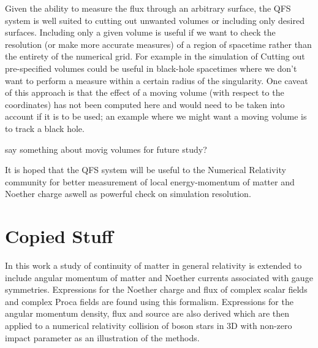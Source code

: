 Given the ability to measure the flux through an arbitrary surface, the QFS system is
well suited to cutting out unwanted volumes or including only desired surfaces. Including
only a given volume is useful if we want to check the resolution (or make more
accurate measures) of a region of spacetime rather than the entirety of the numerical grid. For example
in the simulation of
Cutting out pre-specified volumes could be useful in black-hole spacetimes where we
don't want to perform a measure within a certain radius of the singularity. One caveat of
this approach is that the effect of a moving volume (with respect to the coordinates)
has not been computed here and would need to be taken into account if it is to be used;
an example where we might want a moving volume is to track a black hole.

say something about movig volumes for future study?



It is hoped that the QFS system will be useful to the Numerical Relativity community
for better measurement of local energy-momentum of matter and Noether charge aswell
as powerful check on simulation resolution.





\section{Copied Stuff}



In this work a study of continuity of matter in general relativity is extended to
include angular momentum of matter and Noether currents associated with gauge
symmetries. Expressions for the Noether charge and flux of complex scalar fields
and complex Proca fields are found using this formalism. Expressions for the
angular momentum density, flux and source are also derived which are then applied
to a numerical relativity collision of boson stars in 3D with non-zero impact
parameter as an illustration of the methods.

